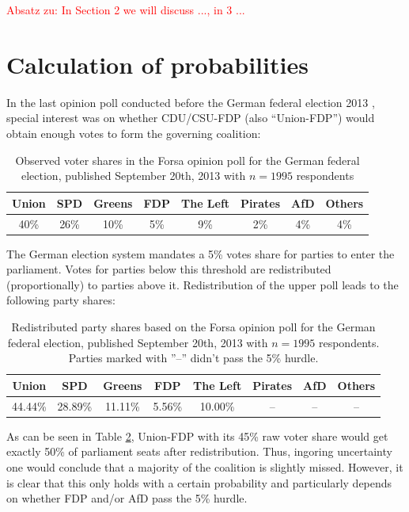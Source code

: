 \documentclass[smallcondensed]{svjour3}     %
\newcommand{\red}[1]{\textcolor{red}{#1}}
\begin{document}
\red{Absatz zu: In Section 2 we will discuss ..., in 3 ...}



\section{Calculation of probabilities} \label{sec:method}
In the last opinion poll conducted before the German federal election 2013 \citep{forsa_2013}, special interest was on whether CDU/CSU-FDP (also ``Union-FDP'') would obtain enough votes to form the governing coalition:

\begin{table}[!ht]\centering
\caption{Observed voter shares in the Forsa opinion poll for the German federal election, published September 20th, 2013 with $n=1995$ respondents
\label{tab_fdp}
}
\medskip
\begin{tabular}{cccccccc}
\toprule[0.09 em]
Union & SPD & Greens & FDP & The Left & Pirates & AfD & Others \\
\midrule
40\% & 26\% & 10\% & 5\% & 9\% & 2\% & 4\% & 4\% \\
\bottomrule[0.09 em]
\end{tabular}
\end{table}

The German election system mandates a 5\% votes share for parties to enter the parliament.
Votes for parties below this threshold are redistributed (proportionally) to parties
above it. Redistribution of the upper poll leads to the following party shares:

\begin{table}[!ht]\centering
\caption{Redistributed party shares based on the Forsa opinion poll for the German federal election, published September 20th, 2013 with $n=1995$ respondents. Parties marked with ''--'' didn't pass the 5\% hurdle.
\label{tab_fdp_redist}
}
\medskip
\begin{tabular}{cccccccc}
\toprule[0.09 em]
Union & SPD & Greens & FDP & The Left & Pirates & AfD & Others \\
\midrule
44.44\% & 28.89\% & 11.11\% & 5.56\% & 10.00\% & -- & -- & -- \\
\bottomrule[0.09 em]
\end{tabular}
\end{table}

As can be seen in Table \ref{tab_fdp_redist}, Union-FDP with its 45\% raw voter share would get exactly 50\% of parliament seats after redistribution. Thus, ingoring uncertainty one would conclude that a majority of the coalition is slightly missed. However, it is clear that this only holds with a certain probability and particularly depends on whether FDP and/or AfD pass the 5\% hurdle.
\end{document}
